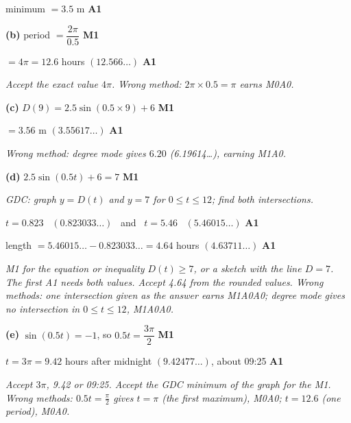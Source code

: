\documentclass[12pt, twoside]{article}
\begin{document}
\begin{enumerate}[itemsep=0.3cm]
minimum $= 3.5$ m \hfill \textbf{A1}

\textbf{(b)} period $= \dfrac{2\pi}{0.5}$ \hfill \textbf{M1}

$= 4\pi = 12.6$ hours \quad $(12.566\ldots)$ \hfill \textbf{A1}

\emph{Accept the exact value $4\pi$. Wrong method: $2\pi \times 0.5 = \pi$
earns M0A0.}

\textbf{(c)} $D(9) = 2.5\sin(0.5 \times 9) + 6$ \hfill \textbf{M1}

$= 3.56$ m \quad $(3.55617\ldots)$ \hfill \textbf{A1}

\emph{Wrong method: degree mode gives $6.20$ (6.19614\ldots), earning
M1A0.}

\textbf{(d)} $2.5\sin(0.5t) + 6 = 7$ \hfill \textbf{M1}

\textit{GDC: graph $y = D(t)$ and $y = 7$ for $0 \le t \le 12$; find both
intersections.}

$t = 0.823$ \ $(0.823033\ldots)$ \ and \ $t = 5.46$ \ $(5.46015\ldots)$
\hfill \textbf{A1}

length $= 5.46015\ldots - 0.823033\ldots = 4.64$ hours
\quad $(4.63711\ldots)$ \hfill \textbf{A1}

\emph{M1 for the equation or inequality $D(t) \ge 7$, or a sketch with the
line $D = 7$. The first A1 needs both values. Accept 4.64 from the
rounded values. Wrong methods: one intersection given as the answer earns
M1A0A0; degree mode gives no intersection in $0 \le t \le 12$, M1A0A0.}

\textbf{(e)} $\sin(0.5t) = -1$, so $0.5t = \dfrac{3\pi}{2}$ \hfill \textbf{M1}

$t = 3\pi = 9.42$ hours after midnight \quad $(9.42477\ldots)$, about
09:25 \hfill \textbf{A1}

\emph{Accept $3\pi$, 9.42 or 09:25. Accept the GDC minimum of the graph
for the M1. Wrong methods: $0.5t = \frac{\pi}{2}$ gives $t = \pi$ (the
first maximum), M0A0; $t = 12.6$ (one period), M0A0.}

\end{enumerate}
\end{document}
